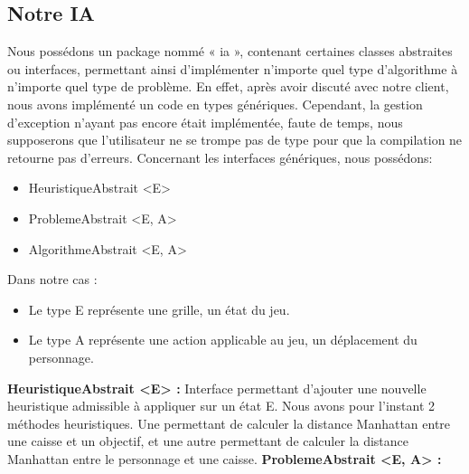 \documentclass[a4paper,12pt]{article} %
\begin{document}
\subsection{Notre IA}
Nous possédons un package nommé « ia », contenant certaines classes abstraites ou interfaces, permettant ainsi d’implémenter n’importe quel type d’algorithme à n’importe quel type de problème. En effet, après avoir discuté avec notre client, nous avons implémenté un code en types génériques.
\newline\newline 
Cependant, la gestion d’exception n’ayant pas encore était implémentée, faute de temps, nous supposerons que l’utilisateur ne se trompe pas de type pour que la compilation ne retourne pas d’erreurs.
\newline\newline 
Concernant les interfaces génériques, nous possédons:
\newline
\begin{itemize}
\item HeuristiqueAbstrait <E>
\item ProblemeAbstrait <E, A>
\item AlgorithmeAbstrait <E, A>
\newline
\end{itemize}
Dans notre cas : 
\newline
\begin{itemize}
\item Le type E représente une grille, un état du jeu.
\item Le type A représente une action applicable au jeu, un déplacement du personnage.
\newline
\end{itemize}
\noindent
\textbf{HeuristiqueAbstrait <E> :}
\newline\newline
Interface permettant d’ajouter une nouvelle heuristique admissible à appliquer sur un état E. Nous avons pour l’instant 2 méthodes heuristiques. Une permettant de calculer la distance Manhattan entre une caisse et un objectif, et une autre permettant de calculer la distance Manhattan entre le personnage et une caisse.
\newline\newline
\noindent
\textbf{ProblemeAbstrait <E, A> :}
\newline\newline
\end{document}
